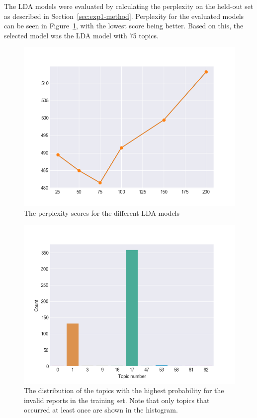 The LDA models were evaluated by calculating the perplexity on the held-out set as described in Section~\ref{sec:exp1-method}.
Perplexity for the evaluated models can be seen in Figure~\ref{fig:lda-perplexity}, with the lowest score being better.
Based on this, the selected model was the LDA model with 75 topics.

\begin{figure}[h!]
    \centering
    \includegraphics[scale=0.9]{figures/lda-perplexity.png}
    \caption{The perplexity scores for the different LDA models}
    \label{fig:lda-perplexity}
\end{figure}

\begin{figure}[h!]
    \centering
    \includegraphics[scale=0.9]{figures/invalid_reports_most_likely_topics_histogram.png}
    \caption{The distribution of the topics with the highest probability for the invalid reports in the training set. Note that only topics that occurred at least once are shown in the histogram.}
    \label{fig:invalid-reports-most-likely-topics}
\end{figure}

